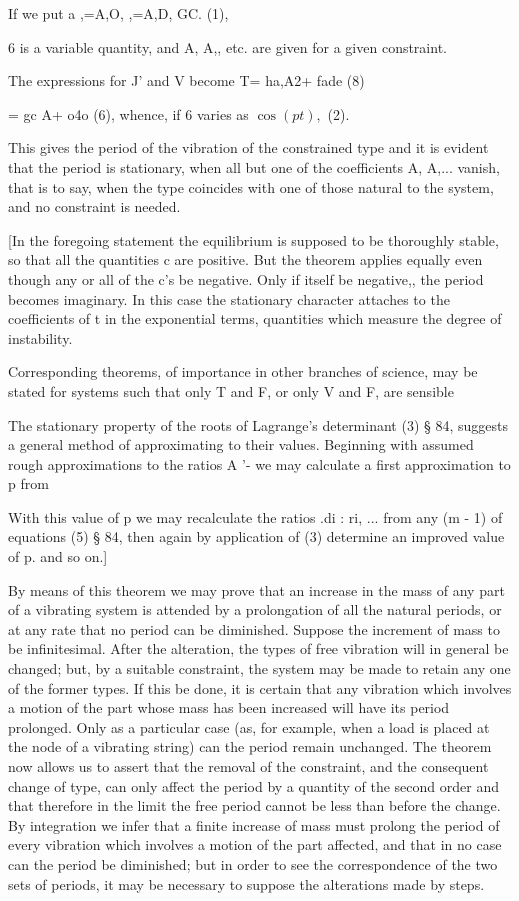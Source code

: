 If we put a ,=A,O, ,=A,D, GC. (1),

6 is a variable quantity, and A, A,, etc. are given for a given constraint.

The expressions for J' and V become T= ha,A2+ fade (8)

= gc A+ o4o (6), whence, if 6 varies as \(\cos(pt),\) (2).

This gives the period of the vibration of the constrained type and it is
evident that the period is stationary, when all but one of the coefficients A,
A,... vanish, that is to say, when the type coincides with one of those natural
to the system, and no constraint is needed.

[In the foregoing statement the equilibrium is supposed to be thoroughly
stable, so that all the quantities c are positive. But the theorem applies
equally even though any or all of the c’s be negative. Only if itself be
negative,, the period becomes imaginary. In this case the stationary character
attaches to the coefficients of t in the exponential terms, quantities which
measure the degree of instability.

Corresponding theorems, of importance in other branches of science, may be
stated for systems such that only T and F, or only V and F, are sensible

The stationary property of the roots of Lagrange’s determinant (3) § 84,
suggests a general method of approximating to their values. Beginning with
assumed rough approximations to the ratios A '- we may calculate a first
approximation to p from

With this value of p we may recalculate the ratios .di : ri, ... from any (m -
1) of equations (5) § 84, then again by application of (3) determine an
improved value of p. and so on.]

By means of this theorem we may prove that an increase in the mass of any part
of a vibrating system is attended by a prolongation of all the natural periods,
or at any rate that no period can be diminished.  Suppose the increment of mass
to be infinitesimal. After the alteration, the types of free vibration will in
general be changed; but, by a suitable constraint, the system may be made to
retain any one of the former types. If this be done, it is certain that any
vibration which involves a motion of the part whose mass has been increased
will have its period prolonged. Only as a particular case (as, for example,
when a load is placed at the node of a vibrating string) can the period remain
unchanged. The theorem now allows us to assert that the removal of the
constraint, and the consequent change of type, can only affect the period by a
quantity of the second order and that therefore in the limit the free period
cannot be less than before the change. By integration we infer that a finite
increase of mass must prolong the period of every vibration which involves a
motion of the part affected, and that in no case can the period be diminished;
but in order to see the correspondence of the two sets of periods, it may be
necessary to suppose the alterations made by steps.

